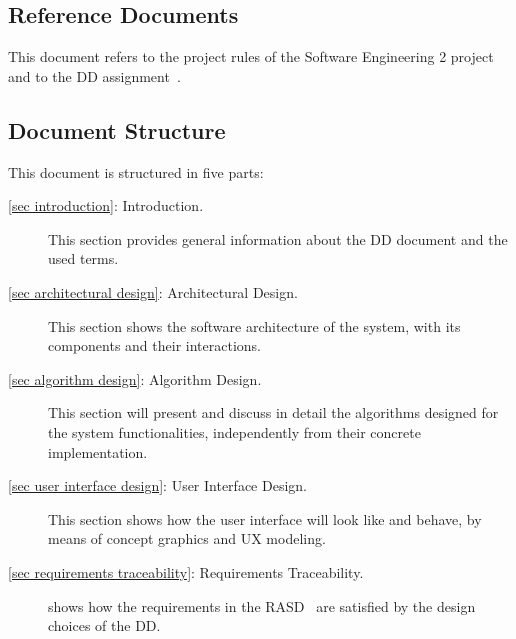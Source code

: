 \subsection{Reference Documents}

This document refers to the project rules of the Software Engineering 2 project~\cite{se-project-rules} and to the DD assignment~\cite{se-assignment}.

\subsection{Document Structure}

This document is structured in five parts:
\begin{description}
	\item[\autoref{sec introduction}: Introduction.] This section provides general information about the DD document and the used terms.
	\item[\autoref{sec architectural design}: Architectural Design.] This section shows the software architecture of the system, with its components and their interactions.
	\item[\autoref{sec algorithm design}: Algorithm Design.] This section will present and discuss in detail the algorithms designed for the system functionalities, independently from their concrete implementation.
	\item[\autoref{sec user interface design}: User Interface Design.] This section shows how the user interface will look like and behave, by means of concept graphics and UX modeling.
	\item[\autoref{sec requirements traceability}: Requirements Traceability.] shows how the requirements in the RASD~\cite{rasd} are satisfied by the design choices of the DD.
\end{description}